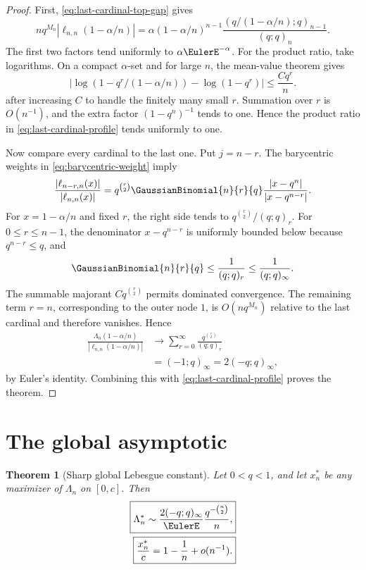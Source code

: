 \documentclass[11pt,oneside]{book}
\numberwithin{equation}{chapter}
\newtheorem{theorem}{Theorem}[chapter]
\theoremstyle{definition}
\theoremstyle{remark}
\newcommand{\Leb}{\Lambda}
\begin{document}
\begin{proof}
First, \eqref{eq:last-cardinal-top-gap} gives
\begin{equation}
 n q^{M_n}|\ell_{n,n}(1-\alpha/n)|
 =\alpha(1-\alpha/n)^{n-1}
   \frac{(q/(1-\alpha/n);q)_{n-1}}{(q;q)_n}.
 \label{eq:last-cardinal-profile}
\end{equation}
The first two factors tend uniformly to $\alpha\EulerE^{-\alpha}$.  For the
product ratio, take logarithms.  On a compact $\alpha$-set and for large
$n$, the mean-value theorem gives
\[
 \left|\log(1-q^r/(1-\alpha/n))-\log(1-q^r)\right|
 \le \frac{Cq^r}{n}.
\]
after increasing $C$ to handle the finitely many small $r$.  Summation over
$r$ is $O(n^{-1})$, and the extra factor $(1-q^n)^{-1}$ tends to one.  Hence
the product ratio in \eqref{eq:last-cardinal-profile} tends uniformly to one.

Now compare every cardinal to the last one.  Put $j=n-r$.  The barycentric
weights in \eqref{eq:barycentric-weight} imply
\begin{equation}
 \frac{|\ell_{n-r,n}(x)|}{|\ell_{n,n}(x)|}
 =q^{\binom r2}\GaussianBinomial{n}{r}{q}
  \frac{|x-q^n|}{|x-q^{n-r}|}.
 \label{eq:cardinal-ratio}
\end{equation}
For $x=1-\alpha/n$ and fixed $r$, the right side tends to
$q^{\binom r2}/(q;q)_r$.  For $0\le r\le n-1$, the denominator
$x-q^{n-r}$ is uniformly bounded below because $q^{n-r}\le q$, and
\[
 \GaussianBinomial{n}{r}{q}\le\frac1{(q;q)_r}\le\frac1{(q;q)_\infty}.
\]
The summable majorant $Cq^{\binom r2}$ permits dominated convergence.  The
remaining term $r=n$, corresponding to the outer node $1$, is
$O(nq^{M_n})$ relative to the last cardinal and therefore vanishes.  Hence
\begin{align*}
 \frac{\Leb_n(1-\alpha/n)}{|\ell_{n,n}(1-\alpha/n)|}
 &\longrightarrow\sum_{r=0}^\infty
   \frac{q^{\binom r2}}{(q;q)_r}\\
 &=(-1;q)_\infty=2(-q;q)_\infty,
\end{align*}
by Euler's identity.  Combining this with
\eqref{eq:last-cardinal-profile} proves the theorem.
\end{proof}

\section{The global asymptotic}

\begin{theorem}[Sharp global Lebesgue constant]
\label{thm:global-lebesgue}
Let $0<q<1$, and let $x_n^*$ be any maximizer of $\Leb_n$ on $[0,c]$.
Then
\begin{align}
 \boxed{
 \Leb_n^*
 \sim \frac{2(-q;q)_\infty}{\EulerE}
       \frac{q^{-\binom n2}}{n},}
 \label{eq:global-lebesgue-asymptotic}\\
 \boxed{
 \frac{x_n^*}{c}=1-\frac1n+o(n^{-1}).}
 \label{eq:global-lebesgue-location}
\end{align}
\end{theorem}
\end{document}
